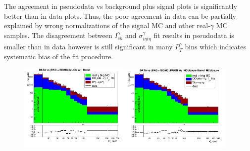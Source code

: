 The agreement in pseudodata vs background plus signal plots is significantly better than in data plots. Thus, the poor agreement in data can be partially explained by wrong normalizations of the signal MC and other real-$\gamma$ MC samples. The disagreement between $I_{ch}^{\gamma}$ and $\sigma_{i\eta i\eta}^{\gamma}$ fit results in pseudodata is smaller than in data however is still significant in many $P_T^{\gamma}$ bins which indicates systematic bias of the fit procedure.

\begin{figure}[htb]
  \begin{center}
   \includegraphics[width=0.48\textwidth]{../figs/figs_v11/MUON_WGamma/PrepareYields/c_DATAvsBkgPlusSigMCc_MUON_WGamma_TEMPL_CHISO_UNblind__Barrel__phoEt.png}\includegraphics[width=0.48\textwidth]{../figs/figs_v11/MUON_WGamma/PrepareYields/c_DATAvsBkgPlusSigMCc_MUON_WGamma_TEMPL_CHISO_UNblind_MCclosure__Barrel__phoEt_MCclosure.png}\\

\end{center}
\end{figure}
